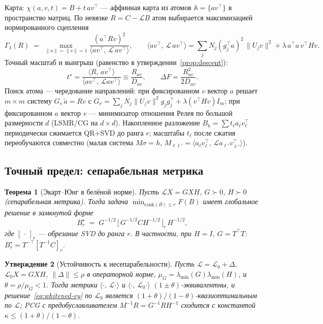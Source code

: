 \documentclass[11pt,a4paper]{article}
\newcommand{\Id}{I}
\newcommand{\T}{^{\!\top}}
\newcommand{\ip}[2]{\langle #1,\,#2\rangle}
\newcommand{\rank}{\mathrm{rank}}
\newcommand{\Lop}{\mathcal{L}}
\theoremstyle{plain}
\newtheorem{theorem}{Теорема}[section]
\newtheorem{prop}[theorem]{Утверждение}
\theoremstyle{definition}
\theoremstyle{remark}
\begin{document}
Карта: $\chi(a,v,t)=B+t\,av\T$ --- аффинная карта из атомов $\mathbb A=\{av\T\}$
в пространство матриц. По невязке $R=C-\Lop B$ атом выбирается максимизацией
нормированного сцепления
\begin{equation}\label{eq:greedy}
\Gamma_1(R)\;=\;\max_{\|a\|=\|v\|=1}\frac{(a\T Rv)^2}{\ip{av\T}{\Lop\,av\T}},
\qquad
\ip{av\T}{\Lop\,av\T}=\sum_j N_j(g_j\T a)^2\,\|U_jv\|^2+\lambda\,a\T a\,v\T Hv .
\end{equation}
Точный масштаб и выигрыш (равенство в утверждении~\ref{prop:descent}):
\begin{equation}\label{eq:tstar}
t^\star=\frac{\ip{R}{av\T}}{\ip{av\T}{\Lop av\T}}\equiv\frac{R_{av}}{D_{av}},
\qquad
\Delta F=\frac{R_{av}^2}{2D_{av}} .
\end{equation}
Поиск атома --- чередование направлений: при фиксированном $v$ вектор $a$
решает $m\times m$ систему $G_v\,\tilde a = Rv$ с
$G_v=\sum_j N_j\|U_jv\|^2 g_jg_j\T+\lambda(v\T Hv)\Id_m$; при фиксированном $a$
вектор $v$ --- минимизатор отношения Релея по большой размерности $d$
(LSMR/CG на $d\times d$). Накопленное разложение $B_k=\sum t_\ell a_\ell v_\ell\T$
периодически сжимается QR+SVD до ранга $r$; масштабы $t_\ell$ после сжатия
переобучаются совместно (малая система $M\sigma=h$,
$M_{\ell\ell'}=\ip{a_\ell v_\ell\T}{\Lop a_{\ell'}v_{\ell'}\T}$).

\subsection{Точный предел: сепарабельная метрика}

\begin{theorem}[Экарт--Юнг в белёной норме]\label{thm:separable}
Пусть $\Lop X=GXH$, $G\succ0$, $H\succ0$ (сепарабельная метрика). Тогда задача
$\min_{\rank(B)\le r}F(B)$ имеет глобальное решение в замкнутой форме
\begin{equation}\label{eq:whitened-ey}
B_r^\star \;=\; G^{-1/2}\,\bigl[\,G^{-1/2}CH^{-1/2}\,\bigr]_r\,H^{-1/2},
\end{equation}
где $[\,\cdot\,]_r$ --- обрезание SVD до ранга $r$. В частности, при $H=\Id$,
$G=T\T T$: $B_r^\star=T^{-\top}[T^{-1}C]_r$.
\end{theorem}

\begin{prop}[Устойчивость к несепарабельности]\label{prop:pert}
Пусть $\Lop=\Lop_0+\Delta$, $\Lop_0X=GXH$, $\|\Delta\|\le\rho$ в операторной
норме, $\mu_G=\lambda_{\min}(G)\lambda_{\min}(H)$, и $\theta=\rho/\mu_G<1$.
Тогда метрики $\ip{\cdot}{\Lop\cdot}$ и $\ip{\cdot}{\Lop_0\cdot}$
$(1\pm\theta)$-эквивалентны, и решение~\eqref{eq:whitened-ey} по $\Lop_0$
является $(1+\theta)/(1-\theta)$-квазиоптимальным по $\Lop$; PCG с
предобуславливателем $M^{-1}R=G^{-1}RH^{-1}$ сходится с константой
$\kappa\le(1+\theta)/(1-\theta)$.
\end{prop}
\end{document}
